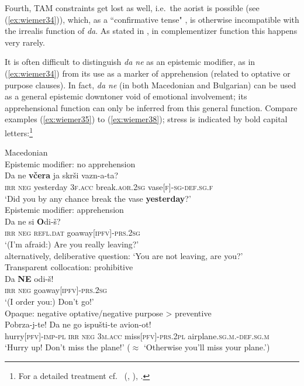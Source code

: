 \documentclass[output=paper,colorlinks,citecolor=brown]{langscibook}
\begin{document}
\noindent Fourth, TAM constraints get lost as well, i.e.\ the aorist is possible (see (\ref{ex:wiemer34})), which, as a ``confirmative tense" \citep{Friedman2000}, is otherwise incompatible with the irrealis function of \textit{da}. As stated in , in complementizer function this happens very rarely.

It is often difficult to distinguish \textit{da ne} as an epistemic modifier, as in (\ref{ex:wiemer34}) from its use as a marker of apprehension (related to optative or purpose clauses). In fact, \textit{da ne} (in both Macedonian and Bulgarian) can be used as a general epistemic downtoner void of emotional involvement; its apprehensional function can only be inferred from this general function. Compare examples  (\ref{ex:wiemer35}) to (\ref{ex:wiemer38}); stress is indicated by bold capital letters:\footnote{For a detailed treatment cf.\ \citeauthor{Mitkovska2015} (\citeyear[37 et passim]{Mitkovska2015}, \citeyear{MitkovskaEtAl2017}), \citet[67--70]{MitkovskaEtAl2017}.}



\ea 
\textnormal{Macedonian} \\
\ea \label{ex:wiemer34} \textnormal{Epistemic modifier: no apprehension} \\
\gll Da ne \textbf{včera} ja skrši vazn-a-ta? \\
\textsc{irr} \textsc{neg} yesterday \textsc{3f.acc} break\textsc{.aor.2sg} vase[\textsc{f}]-\textsc{sg-def.sg.f} \\
\glt `Did you by any chance break the vase \textbf{yesterday}?' \\
\ex \label{ex:wiemer35} \textnormal{Epistemic modifier: apprehension}\\
\gll Da ne {\op}si{\cp} \textbf{O}di-š? \\
\textsc{irr} \textsc{neg} \textsc{refl.dat} go\textunderscore away\textsc{[ipfv]-prs.2sg} \\
\glt `(I'm afraid:) Are you really leaving?' \\
alternatively, deliberative question: `You are not leaving, are you?' \\
\ex \label{ex:wiemer36} \textnormal{Transparent collocation: prohibitive} \\
\gll Da \textbf{NE} odi-š! \\
\textsc{irr} \textsc{neg} go\textunderscore away\textsc{[ipfv]-prs.2sg} \\
\glt `(I order you:) Don't go!' \\
\ex \label{ex:wiemer37} \textnormal{Opaque: negative optative/negative purpose > preventive} \\
\gll Pobrza-j-te! Da ne go ispušti-te avion-ot! \\
hurry\textsc{[pfv]-imp-pl} \textsc{irr} \textsc{neg} \textsc{3m.acc} miss\textsc{[pfv]-prs.2pl} airplane\textsc{.sg.m.-def.sg.m} \\
\glt `Hurry up! Don't miss the plane!' ($\approx$ `Otherwise you'll miss your plane.') 
\end{document}
